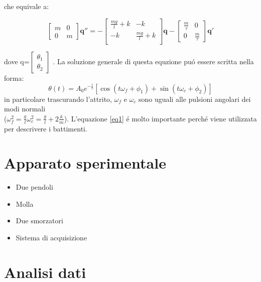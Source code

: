 \documentclass{exam}
\begin{document}
		che equivale a:

		\begin{equation}
			\begin{bmatrix}
				m & 0 \\
				0 & m
			\end{bmatrix}
			\mathbf{q''}=-
			\begin{bmatrix}
				\frac{mg}{l} + k & -k \\
				-k & \frac{mg}{l} + k \\
			\end{bmatrix}
			\mathbf{q} -
			\begin{bmatrix}
				\frac{m}{\tau} & 0 \\
				0 & \frac{m}{\tau} 
			\end{bmatrix}
			\mathbf{q'} 
		\end{equation}

		dove q=$
		\begin{bmatrix}
			\theta_1 \\
			\theta_2
		\end{bmatrix}$
		. La soluzione generale di questa equzione pu\'o essere scritta nella forma:
		\begin{equation}
			\label{eq1}
			\theta(t)= A_0 e^{-\frac{t}{\tau}}[\cos(t\omega_f + \phi_1) +\sin(t\omega_c + \phi_2) ]
		\end{equation}
		in particolare trascurando l'attrito, $\omega_f$ e $\omega_c$ sono uguali alle pulsioni angolari dei modi normali\\($\omega_{f}^2=\frac{g}{l} \omega_{c}^2=\frac{g}{l}+2\frac{k}{m} $). L'equazione \ref{eq1} \'e molto importante perch\'e viene utilizzata per descrivere i battimenti.

	\section{Apparato sperimentale}
		\begin{itemize}
			\item Due pendoli
			\item Molla
			\item Due smorzatori
			\item Sistema di acquisizione
		\end{itemize}

	\section{Analisi dati}
\end{document}
